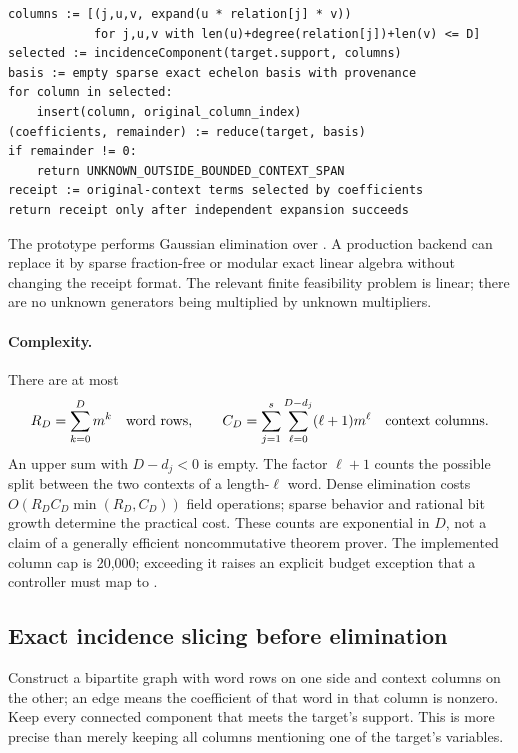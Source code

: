 \begin{lstlisting}
columns := [(j,u,v, expand(u * relation[j] * v))
            for j,u,v with len(u)+degree(relation[j])+len(v) <= D]
selected := incidenceComponent(target.support, columns)
basis := empty sparse exact echelon basis with provenance
for column in selected:
    insert(column, original_column_index)
(coefficients, remainder) := reduce(target, basis)
if remainder != 0:
    return UNKNOWN_OUTSIDE_BOUNDED_CONTEXT_SPAN
receipt := original-context terms selected by coefficients
return receipt only after independent expansion succeeds
\end{lstlisting}

The prototype performs Gaussian elimination over .
A production backend can replace it by sparse fraction-free or modular exact
linear algebra without changing the receipt format. The relevant finite
feasibility problem is linear; there are no unknown generators being multiplied
by unknown multipliers.

\paragraph{Complexity.}
There are at most
\begin{equation}\label{eq:counts}
 R_D=\sum_{k=0}^{D}m^k\quad\hbox{word rows},\qquad
 C_D=\sum_{j=1}^{s}\sum_{\ell=0}^{D-d_j}(\ell+1)m^\ell
 \quad\hbox{context columns}.
\end{equation}
An upper sum with $D-d_j<0$ is empty. The factor $\ell+1$ counts the possible
split between the two contexts of a length-$\ell$ word. Dense elimination costs
$O(R_D C_D\min(R_D,C_D))$ field operations; sparse behavior and rational bit
growth determine the practical cost. These counts are exponential in $D$, not
a claim of a generally efficient noncommutative theorem prover. The implemented
column cap is 20,000; exceeding it raises an explicit budget exception that a
controller must map to \unknown{}.

\subsection{Exact incidence slicing before elimination}

Construct a bipartite graph with word rows on one side and context columns on
the other; an edge means the coefficient of that word in that column is nonzero.
Keep every connected component that meets the target's support. This is more
precise than merely keeping all columns mentioning one of the target's variables.

